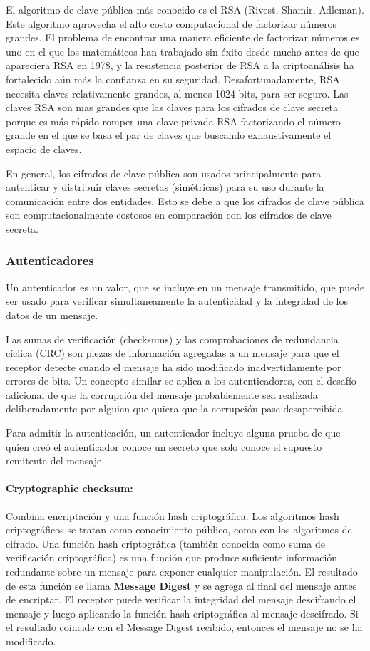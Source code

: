 El algoritmo de clave pública más conocido es el RSA (Rivest, Shamir, Adleman). Este algoritmo aprovecha el alto costo computacional de factorizar números grandes. El problema de encontrar una manera eficiente de factorizar números es uno en el que los matemáticos han trabajado sin éxito desde mucho antes de que apareciera RSA en 1978, y la resistencia posterior de RSA a la criptoanálisis ha fortalecido aún más la confianza en su seguridad. Desafortunadamente, RSA necesita claves relativamente grandes, al menos 1024 bits, para ser seguro. Las claves RSA son mas grandes que las claves para los cifrados de clave secreta porque es más rápido romper una clave privada RSA factorizando el número grande en el que se basa el par de claves que buscando exhaustivamente el espacio de claves.

En general, los cifrados de clave pública son usados principalmente para autenticar y distribuir claves secretas (simétricas) para su uso durante la comunicación entre dos entidades. Esto se debe a que los cifrados de clave pública son computacionalmente costosos en comparación con los cifrados de clave secreta.


\subsubsection{Autenticadores}
Un autenticador es un valor, que se incluye en un mensaje transmitido, que puede ser usado para verificar simultaneamente la autenticidad y la integridad de los datos de un mensaje.

Las sumas de verificación (checksums) y las comprobaciones de redundancia cíclica (CRC) son piezas de información agregadas a un mensaje para que el receptor detecte cuando el mensaje ha sido modificado inadvertidamente por errores de bits. Un concepto similar se aplica a los autenticadores, con el desafío adicional de que la corrupción del mensaje probablemente sea realizada deliberadamente por alguien que quiera que la corrupción pase desapercibida.

Para admitir la autenticación, un autenticador incluye alguna prueba de que quien creó el autenticador conoce un secreto que solo conoce el supuesto remitente del mensaje. 

\paragraph{Cryptographic checksum: }  Combina encriptación y una función hash criptográfica. Los algoritmos hash criptográficos se tratan como conocimiento público, como con los algoritmos de cifrado. Una función hash criptográfica (también conocida como suma de verificación criptográfica) es una función que produce suficiente información redundante sobre un mensaje para exponer cualquier manipulación. El resultado de esta función se llama \textbf{Message Digest} y se agrega al final del mensaje antes de encriptar. El receptor puede verificar la integridad del mensaje descifrando el mensaje y luego aplicando la función hash criptográfica al mensaje descifrado. Si el resultado coincide con el Message Digest recibido, entonces el mensaje no se ha modificado. 

